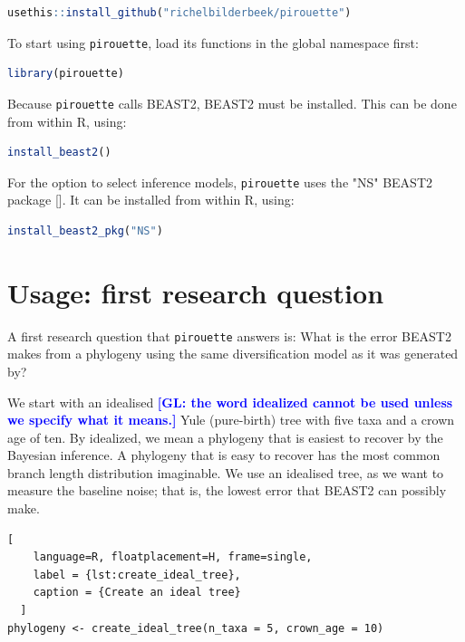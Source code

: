 \documentclass{article}
\newcommand{\giovanni}[1]{\textcolor{blue}{\textbf{[GL: #1]}}}
\begin{document}
\begin{lstlisting}[language=R, floatplacement=H, frame=single]
usethis::install_github("richelbilderbeek/pirouette")
\end{lstlisting}

To start using \verb;pirouette;, load its functions in the global namespace first:

\begin{lstlisting}[language=R, floatplacement=H, frame=single]
library(pirouette)
\end{lstlisting}
Because \verb;pirouette; calls BEAST2, BEAST2 must be installed. 
This can be done from within R, using:

\begin{lstlisting}[language=R, floatplacement=H, frame=single]
install_beast2()
\end{lstlisting}
For the option to select inference models,
\verb;pirouette; uses the "NS" BEAST2 package [\cite{maturana2018model}].
It can be installed from within R, using:

\begin{lstlisting}[language=R, floatplacement=H, frame=single]
install_beast2_pkg("NS")
\end{lstlisting}

\section{Usage: first research question}

A first research question that \verb;pirouette; answers is:
What is the error BEAST2 makes from a phylogeny using the same 
diversification model as it was generated by?

We start with an idealised \giovanni{the word idealized cannot be used unless we specify what it means.} Yule (pure-birth) tree 
with five taxa and a crown age of ten.
By idealized, we mean a phylogeny that is easiest to recover
by the Bayesian inference. A phylogeny that is easy to recover has
the most common branch length distribution imaginable. We
use an idealised tree, as we want to measure the baseline noise; that is,
the lowest error that BEAST2 can possibly make.

\begin{lstlisting}[
    language=R, floatplacement=H, frame=single, 
    label = {lst:create_ideal_tree}, 
    caption = {Create an ideal tree}
  ]
phylogeny <- create_ideal_tree(n_taxa = 5, crown_age = 10)
\end{lstlisting}
\end{document}

